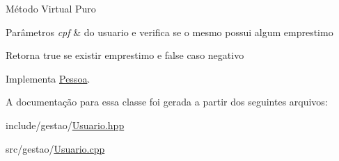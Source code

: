 Método Virtual Puro 
\begin{DoxyParams}{Parâmetros}
{\em cpf} & do usuario e verifica se o mesmo possui algum emprestimo \\
\hline
\end{DoxyParams}
\begin{DoxyReturn}{Retorna}
true se existir emprestimo e false caso negativo 
\end{DoxyReturn}


Implementa \mbox{\hyperlink{class_pessoa_a547989725eea2157a721541846091929}{Pessoa}}.



A documentação para essa classe foi gerada a partir dos seguintes arquivos\+:\begin{DoxyCompactItemize}
\item 
include/gestao/\mbox{\hyperlink{_usuario_8hpp}{Usuario.\+hpp}}\item 
src/gestao/\mbox{\hyperlink{_usuario_8cpp}{Usuario.\+cpp}}\end{DoxyCompactItemize}
